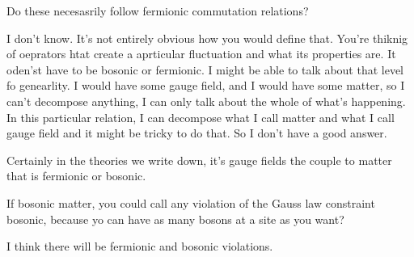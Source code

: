 \begin{question}
    Do these necesasrily follow fermionic commutation relations?
\end{question}
I don't know.
It's not entirely obvious how you would define that.
You're thiknig of oeprators htat create a aprticular fluctuation and what its
properties are.
It oden'st have to be bosonic or fermionic.
I might be able to talk about that level fo genearlity.
I would have some gauge field,
and I would have some matter,
so I can't decompose anything,
I can only talk about the whole of what's happening.
In this particular relation,
I can decompose what I call matter and what I call gauge field and it might be
tricky to do that.
So I don't have a good answer.

Certainly in the theories we write down,
it's gauge fields the couple to matter that is fermionic or bosonic.

\begin{question}
    If bosonic matter,
    you could call any violation of the Gauss law constraint bosonic,
    because yo can have as many bosons at a site as you want?
\end{question}
I think there will be fermionic and bosonic violations.
